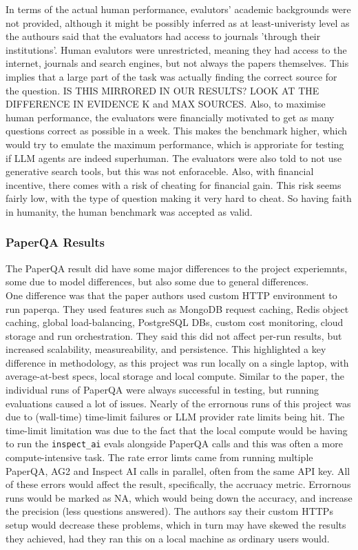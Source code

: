 In terms of the actual human performance, evalutors' academic backgrounds were not provided, although it might be possibly inferred as at least-univeristy level as the authours said that the evaluators had access to journals 'through their institutions'. Human evalutors were unrestricted, meaning they had access to the internet, journals and search engines, but not always the papers themselves. This implies that a large part of the task was actually finding the correct source for the question. IS THIS MIRRORED IN OUR RESULTS? LOOK AT THE DIFFERENCE IN EVIDENCE K and MAX SOURCES. Also, to maximise human performance, the evaluators were financially motivated to get as many questions correct as possible in a week. This makes the benchmark higher, which would try to emulate the maximum performance, which is approriate for testing if LLM agents are indeed superhuman. The evaluators were also told to not use generative search tools, but this was not enforaceble. Also, with financial incentive, there comes with a risk of cheating for financial gain. This risk seems fairly low, with the type of question making it very hard to cheat. So having faith in humanity, the human benchmark was accepted as valid. \\

\subsubsection{PaperQA Results}
The PaperQA result did have some major differences to the project experiemnts, some due to model differences, but also some due to general differences. \\

One difference was that the paper authors used custom HTTP environment to run paperqa. They used features such as MongoDB request caching, Redis object caching, global load-balancing, PostgreSQL DBs, custom cost monitoring, cloud storage and run orchestration. They said this did not affect per-run results, but increased scalability, measureability, and persistence. This highlighted a key difference in methodology, as this project was run locally on a single laptop, with average-at-best specs, local storage and local compute. Similar to the paper, the individual runs of PaperQA were always successful in testing, but running evaluations caused a lot of issues. Nearly of the errornous runs of this project was due to (wall-time) time-limit failures or LLM provider rate limits being hit. The time-limit limitation was due to the fact that the local compute would be having to run the \texttt{inspect\_ai} evals alongside PaperQA calls and this was often a more compute-intensive task. The rate error limts came from running multiple PaperQA, AG2 and Inspect AI calls in parallel, often from the same API key. All of these errors would affect the result, specifically, the accruacy metric. Errornous runs would be marked as NA, which would being down the accuracy, and increase the precision (less questions answered). The authors say their custom HTTPs setup would decrease these problems, which in turn may have skewed the results they achieved, had they ran this on a local machine as ordinary users would. 



